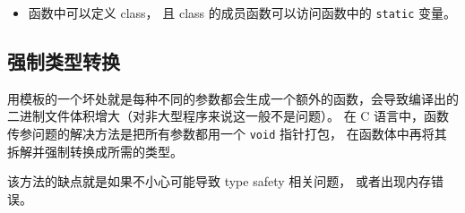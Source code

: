 \begin{itemize}
\item 函数中可以定义 class， 且 class 的成员函数可以访问函数中的 \verb`static` 变量。
\end{itemize}

\subsection{强制类型转换}
用模板的一个坏处就是每种不同的参数都会生成一个额外的函数，会导致编译出的二进制文件体积增大（对非大型程序来说这一般不是问题）。 在 C 语言中，函数传参问题的解决方法是把所有参数都用一个 \verb`void` 指针打包， 在函数体中再将其拆解并强制转换成所需的类型。

该方法的缺点就是如果不小心可能导致 type safety 相关问题， 或者出现内存错误。
